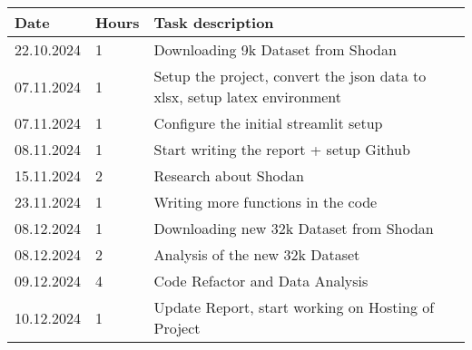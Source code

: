 \documentclass[11pt,a4paper]{article}
\begin{document}
\begin{table}[H]
\centering
\begin{tabular}{|l|l|l|}
\hline
\textbf{Date} & \textbf{Hours} & \textbf{Task description} \\ \hline
22.10.2024 & 1 & Downloading 9k Dataset from Shodan \\ \hline
07.11.2024 & 1 & Setup the project, convert the json data to xlsx, setup latex environment \\ \hline
07.11.2024 & 1 & Configure the initial streamlit setup \\ \hline
08.11.2024 & 1 & Start writing the report + setup Github \\ \hline
15.11.2024 & 2 & Research about Shodan\\ \hline
23.11.2024 & 1 & Writing more functions in the code\\ \hline
08.12.2024 & 1 & Downloading new 32k Dataset from Shodan \\ \hline
08.12.2024 & 2 & Analysis of the new 32k Dataset \\ \hline
09.12.2024 & 4 & Code Refactor and Data Analysis \\ \hline
10.12.2024 & 1 & Update Report, start working on Hosting of Project \\ \hline



\end{tabular}
\end{table}

\newpage
\end{document}
